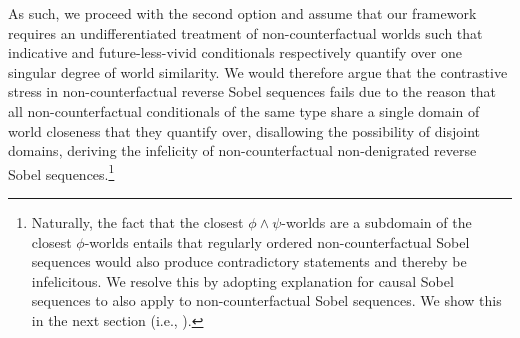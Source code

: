 As such, we proceed with the second option and assume that our framework requires an undifferentiated treatment of non-counterfactual worlds such that indicative and future-less-vivid conditionals respectively quantify over one singular degree of world similarity. We would therefore argue that the contrastive stress in non-counterfactual reverse Sobel sequences fails due to the reason that all non-counterfactual conditionals of the same type share a single domain of world closeness that they quantify over, disallowing the possibility of disjoint domains, deriving the infelicity of non-counterfactual non-denigrated reverse Sobel sequences.\footnote{Naturally, the fact that the closest $\phi\land\psi$-worlds are a subdomain of the closest $\phi$-worlds entails that regularly ordered non-counterfactual Sobel sequences would also produce contradictory statements and thereby be infelicitous. We resolve this by adopting  explanation for causal Sobel sequences to also apply to non-counterfactual Sobel sequences. We show this in the next section (i.e., ).}

